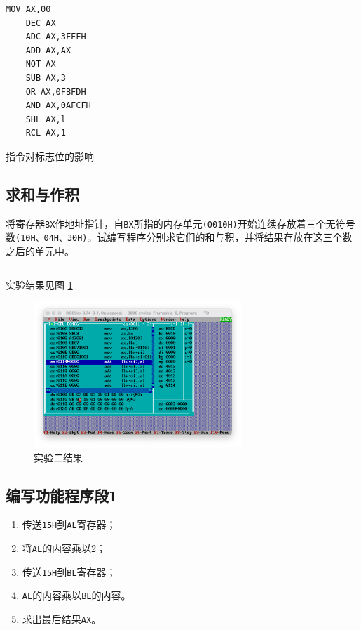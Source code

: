 \documentclass[11pt]{SEU-Digital-Report}
\begin{document}
\begin{lstlisting}[language={[x86masm]Assembler},title=code4]
    MOV AX,00
    DEC AX
    ADC AX,3FFFH
    ADD AX,AX
    NOT AX
    SUB AX,3
    OR AX,0FBFDH
    AND AX,0AFCFH
    SHL AX,l
    RCL AX,1   
\end{lstlisting}

\begin{analyze}{指令对标志位的影响}{}

\end{analyze}

\subsection{求和与作积}
将寄存器\texttt{BX}作地址指针，自\texttt{BX}所指的内存单元\texttt{(0010H)}开始连续存放着三个无符号数\texttt{(10H、04H、30H)}。试编写程序分别求它们的和与积，并将结果存放在这三个数之后的单元中。
\begin{lstlisting}[language={[x86masm]Assembler},title=code]

\end{lstlisting}

实验结果见图 \ref{fig:rlt2}
\begin{figure}[htbp]
    \centering
    \includegraphics[width=0.7\textwidth]{fig/task4.png}
    \caption{实验二结果}
    \label{fig:rlt2} 
\end{figure}

\subsection{编写功能程序段1}
\begin{enumerate}
    \item 传送\texttt{15H}到\texttt{AL}寄存器；
    \item 将\texttt{AL}的内容乘以2；
    \item 传送\texttt{15H}到\texttt{BL}寄存器；
    \item \texttt{AL}的内容乘以\texttt{BL}的内容。
    \item 求出最后结果\texttt{AX}。
\end{enumerate}
\end{document}
